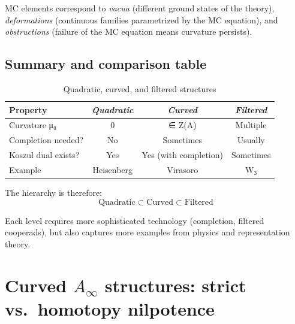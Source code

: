 \begin{remark}
MC elements correspond to \emph{vacua} (different ground states of the theory), \emph{deformations} (continuous families parametrized by the MC equation), and \emph{obstructions} (failure of the MC equation means curvature persists).
\end{remark}

\subsection{Summary and comparison table}
\label{sec:curved-summary}

\begin{table}[ht]
\centering
\caption{Quadratic, curved, and filtered structures}
\begin{tabular}{|l|c|c|c|}
\hline
\textbf{Property} & \emph{Quadratic} & \emph{Curved} & \emph{Filtered}\\
\hline
Curvature μ₀ & 0 & ∈ Z(A) & Multiple\\
Completion needed? & No & Sometimes & Usually\\
Koszul dual exists? & Yes & Yes (with completion) & Sometimes\\
Example & Heisenberg & Virasoro & W₃\\
\hline
\end{tabular}
\end{table}

The hierarchy is therefore:
\begin{equation}
\text{Quadratic} \subset \text{Curved} \subset \text{Filtered}
\end{equation}

Each level requires more sophisticated technology (completion, filtered cooperads), but 
also captures more examples from physics and representation theory.

\section{\texorpdfstring{Curved $A_\infty$ structures: strict vs.\ homotopy nilpotence}{Curved A-infinity structures: strict vs homotopy nilpotence}}
\label{sec:strict-vs-homotopy}

